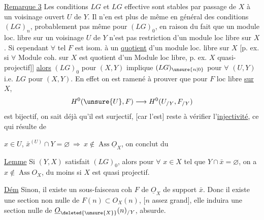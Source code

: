 \uline{Remarque 3} Les conditions $LG$ et $LG$ effective sont
stables par passage de $X$ à un voisinage ouvert $U$ de $Y$.
Il n'en est plus de même en général des conditions $(LG)_n$,
probablement pas même pour $(LG)_0$, en raison du fait
que un module loc. libre  sur un voisinage $U$
de $Y$ n'est pas restriction d'un module loc libre sur
 $X$.
Si cependant $\forall$ tel $F$ est isom. à un \uline{quotient}
d'un module loc. libre sur $X$ [p. ex. si $\forall$ Module
coh. sur $X$ est quotient d'un Module loc libre,
p. ex. $X$ quasi-projectif]]
\uline{alors} $(LG)_0$ pour $(X,Y)$ implique
$(LG)_{\unsure{n|0}}$ pour $\forall$ $(U,Y)$ i.e. $LG$ pour $(X,Y)$.
En effet on est ramené à prouver que pour $F$ loc libre
\uline{sur $X$},
\[
H^0(\unsure{U},F)\longrightarrow H^0(U_{/Y},F_{/Y})
\]
est bijectif, on sait déjà qu'il est surjectif,
[car
l'est] reste à vérifier l'\uline{injectivité}, ce qui résulte de
 


$x\in U$, $\bar x^{(U)}\cap Y=\varnothing\ \Longrightarrow\
x\notin\operatorname{Ass}\underline O_X$, on conclut du

\uline{Lemme} Si $(Y,X)$ satisfait $(LG)_0$, alors pour
$\forall$ $x\in X$ tel que $Y\cap\bar x=\varnothing$,
on a $x\notin\operatorname{Ass}O_X$, du moins si $X$ est
quasi projectif.

\uline{Dém} Sinon, il existe un sous-faisceau coh $F$
 de $\underline O_X$
 de support $\bar x$.
Donc il existe une section non nulle de $F(n)\subset O_X(n)$,
[$n$ assez grand],  
elle induira une section nulle de
$\underline O_{\deleted{\unsure{X}}}(n)_{/Y}$, absurde.



